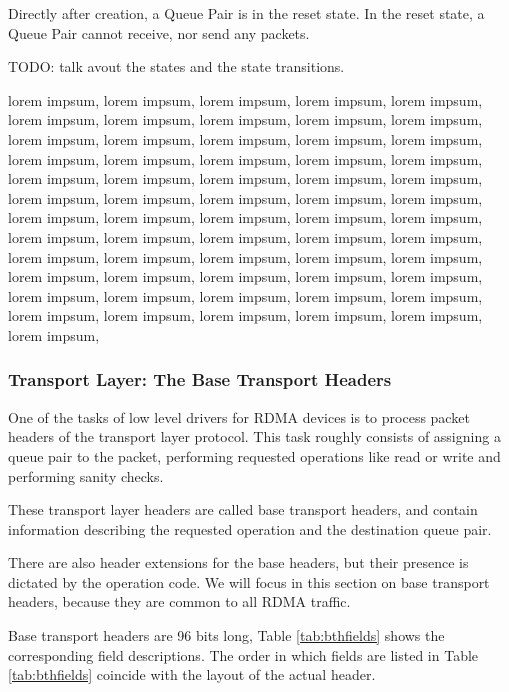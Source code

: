 
Directly after creation, a Queue Pair is in the reset state. In the reset state, a Queue Pair cannot receive, nor send any packets.

TODO: talk avout the states and the state transitions.

lorem impsum, lorem impsum, lorem impsum, lorem impsum, lorem impsum, lorem impsum, lorem impsum, lorem impsum, lorem impsum, lorem impsum, lorem impsum,
lorem impsum, lorem impsum, lorem impsum, lorem impsum, lorem impsum, lorem impsum, lorem impsum, lorem impsum, lorem impsum, lorem impsum,
lorem impsum, lorem impsum, lorem impsum, lorem impsum, lorem impsum, lorem impsum, lorem impsum, lorem impsum, lorem impsum, lorem impsum,
lorem impsum, lorem impsum, lorem impsum, lorem impsum, lorem impsum, lorem impsum, lorem impsum, lorem impsum, lorem impsum, lorem impsum,
lorem impsum, lorem impsum, lorem impsum, lorem impsum, lorem impsum, lorem impsum, lorem impsum, lorem impsum, lorem impsum, lorem impsum,
lorem impsum, lorem impsum, lorem impsum, lorem impsum, lorem impsum, lorem impsum, lorem impsum, lorem impsum, lorem impsum, lorem impsum,

\subsubsection{Transport Layer: The Base Transport Headers} %

One of the tasks of low level drivers for RDMA devices is to process
packet headers of the transport layer protocol. This task roughly consists
of assigning a queue pair to the packet, performing requested operations like
read or write and performing sanity checks.

These transport layer headers are called
base transport headers, and contain information describing the
requested operation and the  destination queue pair.

There are also header extensions for the base headers, but their presence is dictated
by the operation code. We will focus in this section on base transport headers,
because they are common to all RDMA traffic.

Base transport headers are 96 bits long, Table
\ref{tab:bthfields} shows the corresponding field descriptions. The order in which fields
are listed in Table \ref{tab:bthfields} coincide with the layout of the actual header.

